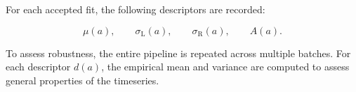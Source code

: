 \documentclass[pdflatex,sn-mathphys-num]{sn-jnl}%
\theoremstyle{thmstyleone}%
\theoremstyle{thmstyletwo}%
\theoremstyle{thmstylethree}%
\begin{document}
For each accepted fit, the following descriptors are recorded:


\[
\mu(a), \qquad \sigma_{\mathrm{L}}(a), \qquad \sigma_{\mathrm{R}}(a), \qquad A(a).
\]



To assess robustness, the entire pipeline is repeated across multiple batches.
For each descriptor $d(a)$, the empirical mean and variance are computed to assess general properties of the timeseries.








\end{document}
